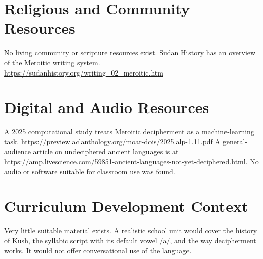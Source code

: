 \documentclass[12pt]{article}
\begin{document}
\section{Religious and Community Resources}
No living community or scripture resources exist. Sudan History has an overview of the Meroitic writing system. \url{https://sudanhistory.org/writing_02_meroitic.htm}

\section{Digital and Audio Resources}
A 2025 computational study treats Meroitic decipherment as a machine-learning task. \url{https://preview.aclanthology.org/moar-dois/2025.alp-1.11.pdf} A general-audience article on undeciphered ancient languages is at \url{https://amp.livescience.com/59851-ancient-languages-not-yet-deciphered.html}. No audio or software suitable for classroom use was found.

\section{Curriculum Development Context}
Very little suitable material exists. A realistic school unit would cover the history of Kush, the syllabic script with its default vowel /a/, and the way decipherment works. It would not offer conversational use of the language.
\end{document}
